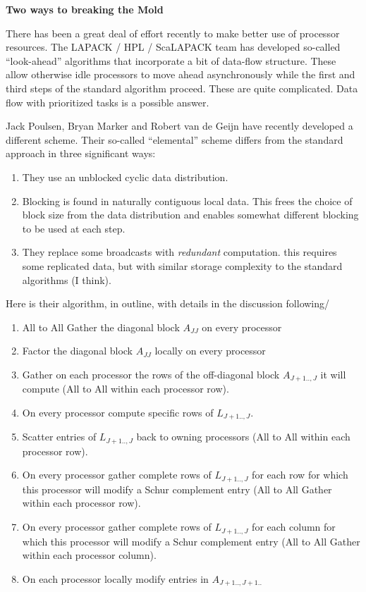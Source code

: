 \documentclass[10pt]{article}
\begin{document}
{\large \bf Two ways to breaking the Mold}

There has been a great deal of effort recently to make better use of processor
resources.  The LAPACK / HPL / ScaLAPACK team has developed so-called
``look-ahead'' algorithms that incorporate a bit of data-flow structure.  These
allow otherwise idle processors to move ahead asynchronously while the first and
third steps of the standard algorithm proceed.  These are quite complicated.
Data flow with prioritized tasks is a possible answer.

Jack Poulsen, Bryan Marker and Robert van de Geijn have recently developed a
different scheme.  Their so-called ``elemental'' scheme differs from the
standard approach in three significant ways:

\begin{enumerate}
\item They use an unblocked cyclic data distribution.  
\item Blocking is found in naturally contiguous local data.  This frees the
  choice of block size from the data distribution and enables somewhat different
  blocking to be used at each step. 
\item They replace some broadcasts with \emph{redundant} computation.  this
  requires some replicated data, but with similar storage complexity to the
  standard algorithms (I think).
\end{enumerate}

Here is their algorithm, in outline, with details in the discussion following/

\begin{enumerate}
\item All to All Gather the diagonal block $A_{JJ}$ on every processor
\item Factor the diagonal block $A_{JJ}$ locally on every processor
\item Gather on each processor the rows of the off-diagonal block $A_{J+1..,J}$
  it will compute (All to All within each processor row).
\item On every processor compute specific rows of $L_{J+1..,J}$.
\item Scatter entries of $L_{J+1..,J}$ back to owning processors (All to All
  within each processor row).
\item On every processor gather complete rows of $L_{J+1..,J}$ for each row for
  which this processor will modify a Schur complement entry (All to All Gather
  within each processor row).
\item On every processor gather complete rows of $L_{J+1..,J}$ for each column
  for which this processor will modify a Schur complement entry (All to All
  Gather within each processor column).
\item On each processor locally modify entries in $A_{J+1..,J+1..}$
\end{enumerate}
\end{document}
